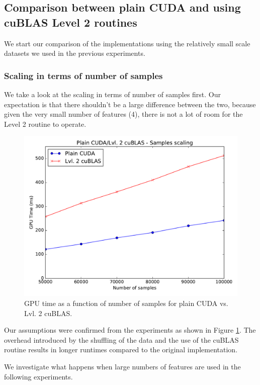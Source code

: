 \documentclass[11pt,a4paper]{article}
\begin{document}
\pagebreak

\subsection{Comparison between plain CUDA and using cuBLAS Level 2 routines}

We start our comparison of the implementations using the relatively small scale datasets
we used in the previous experiments.

\subsubsection*{Scaling in terms of number of samples}

We take a look at the scaling in terms of number of samples first. Our expectation is that there shouldn't be a large difference
between the two, because given the very small number of features (4), there is not a lot of room
for the Level 2 routine to operate.

\begin{figure}[H]
	\centering
	\includegraphics[width=0.8\linewidth]{gpu_plain_vs_Lvl2cuBLAS-50k-100k.pdf}
	\caption{GPU time as a function of number of samples for plain CUDA vs. Lvl. 2 cuBLAS.}
	\label{fig:plain-cublas-n-samples}
\end{figure}

Our assumptions were confirmed from the experiments as shown in Figure \ref{fig:plain-cublas-n-samples}.
The overhead introduced by the shuffling of the data and the use of the cuBLAS routine
results in longer runtimes compared to the original implementation.

We investigate what happens when large numbers of features are used in the following experiments.
\end{document}
